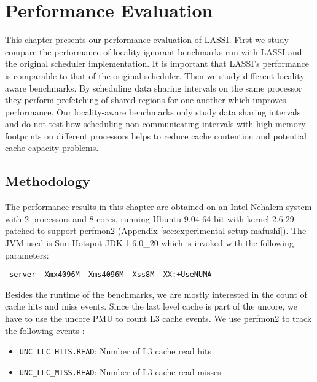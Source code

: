 
\chapter{Performance Evaluation}
\label{chap:locality-performance}

This chapter presents our performance evaluation of LASSI. First we
study compare the performance of locality-ignorant benchmarks run with
LASSI and the original scheduler implementation. It is important that
LASSI's performance is comparable to that of the original
scheduler. Then we study different locality-aware benchmarks. By
scheduling data sharing intervals on the same processor they perform
prefetching of shared regions for one another which improves
performance. Our locality-aware benchmarks only study data sharing
intervals and do not test how scheduling non-communicating intervals
with high memory footprints on different processors helps to reduce
cache contention and potential cache capacity problems.

\section{Methodology}
\label{sec:locality-performance-methodology}

The performance results in this chapter are obtained on an Intel
Nehalem system with 2 processors and 8 cores, running Ubuntu 9.04
64-bit with kernel 2.6.29 patched to support perfmon2
\cite{Eranian2008} (Appendix
\ref{sec:experimental-setup-mafushi}). The JVM used is Sun Hotspot JDK
1.6.0\_20 which is invoked with the following parameters:

\begin{lstlisting}[style=Listing]
  -server -Xmx4096M -Xms4096M -Xss8M -XX:+UseNUMA
\end{lstlisting}

Besides the runtime of the benchmarks, we are mostly interested in the
count of cache hits and miss events. Since the last level cache is
part of the uncore, we have to use the uncore PMU to count L3 cache
events. We use perfmon2 to track the following events
\cite{Levinthal2009}:

\begin{itemize}
\item \lstinline!UNC_LLC_HITS.READ!: Number of L3 cache read hits
\item \lstinline!UNC_LLC_MISS.READ!: Number of L3 cache read misses
\end{itemize}

